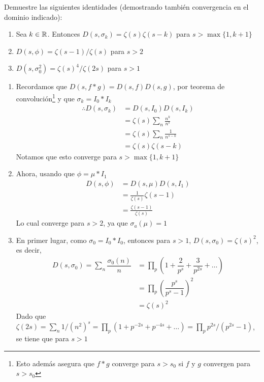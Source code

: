 \begin{prob}[2 pts. c/u]
    Demuestre las siguientes identidades (demostrando también convergencia en el dominio indicado):
    \begin{enumerate}[label = (\roman*)]
        \item Sea $k\in\mathbb{R}$. Entonces $D(s,\sigma_k)=\zeta(s)\zeta(s-k)$ para $s>\max\{1,k+1\}$

        \item $D(s,\phi)=\zeta(s-1)/\zeta(s)$ para $s>2$

        \item $D(s,\sigma_0^2)=\zeta(s)^4/\zeta(2s)$ para $s>1$
    \end{enumerate}
\end{prob}
\begin{sol}
    \begin{enumerate}[label = (\roman*)]
        \item Recordamos que $D(s,f*g)=D(s,f)D(s,g)$, por teorema de convolución\footnote{Esto además asegura que $f*g$ converge para $s>s_0$ si $f$ y $g$ convergen para $s>s_0$} y que $\sigma_k=I_0*I_k$
        \begin{align*}
            \therefore D(s,\sigma_k)&=D(s,I_0)D(s,I_k)\\
            &=\zeta(s)\sum_n\frac{n^k}{n^s}\\
            &=\zeta(s)\sum_n\frac{1}{n^{s-k}}\\
            &=\zeta(s)\zeta(s-k)
        \end{align*}
        Notamos que esto converge para $s>\max\{1,k+1\}$

        \item Ahora, usando que $\phi=\mu*I_1$
        \begin{align*}
            D(s,\phi)&=D(s,\mu)D(s,I_1)\\
            &=\frac{1}{\zeta(s)}\zeta(s-1)\\
            &=\frac{\zeta(s-1)}{\zeta(s)}
        \end{align*}
        Lo cual converge para $s>2$, ya que $\sigma_a(\mu)=1$

        \item En primer lugar, como $\sigma_0 = I_0 \ast I_0$, entonces para $s>1$, $D(s,\sigma_0) = \zeta(s)^2$, es decir,
        \begin{align*}
            D(s,\sigma_0) = \sum_n \dfrac{\sigma_0(n)}{n} &= \prod_p \left(1 + \dfrac{2}{p^s} + \dfrac{3}{p^{2s}} + \ldots\right)\\
            &= \prod_p \left(\dfrac{p^s}{p^s-1}\right)^2\\
            &= \zeta(s)^2
        \end{align*}
        Dado que $\zeta(2s) = \sum_n 1/(n^2)^s = \prod_p (1 + p^{-2s} + p^{-4s} + \ldots) = \prod_p p^{2s}/(p^{2s}-1)$, se tiene que para $s>1$


\end{enumerate}
\end{sol}
